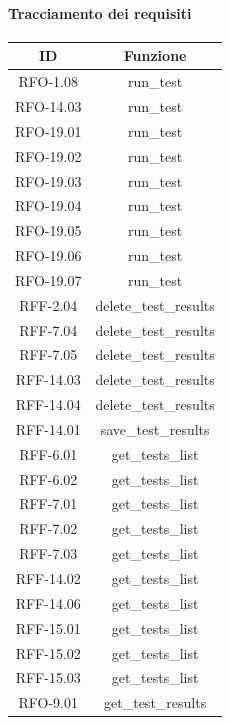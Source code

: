 \paragraph{Tracciamento dei requisiti}
\begin{tabularx}{\textwidth}{|c|c|}
    \hline
    \textbf{ID} & \textbf{Funzione} \\
    \hline
        RFO-1.08 & run\_test\\
    \hline
        RFO-14.03 & run\_test\\
    \hline
        RFO-19.01 & run\_test\\
    \hline
        RFO-19.02 & run\_test\\
    \hline
        RFO-19.03 & run\_test\\
    \hline
        RFO-19.04 & run\_test\\
    \hline
        RFO-19.05 & run\_test\\
    \hline
        RFO-19.06 & run\_test\\
    \hline
        RFO-19.07 & run\_test\\
    \hline
        RFF-2.04 & delete\_test\_results\\
    \hline
        RFF-7.04 & delete\_test\_results\\
    \hline
        RFF-7.05 & delete\_test\_results\\
    \hline
        RFF-14.03 & delete\_test\_results\\
    \hline
        RFF-14.04 & delete\_test\_results\\
    \hline
        RFF-14.01 & save\_test\_results\\
    \hline
        RFF-6.01 & get\_tests\_list\\
    \hline
        RFF-6.02 & get\_tests\_list\\
    \hline
        RFF-7.01 & get\_tests\_list\\
    \hline
        RFF-7.02 & get\_tests\_list\\
    \hline
        RFF-7.03 & get\_tests\_list\\
    \hline
        RFF-14.02 & get\_tests\_list\\
    \hline
        RFF-14.06 & get\_tests\_list\\
    \hline
        RFF-15.01 & get\_tests\_list\\
    \hline
        RFF-15.02 & get\_tests\_list\\
    \hline
        RFF-15.03 & get\_tests\_list\\
    \hline
        RFO-9.01 & get\_test\_results\\

\end{tabularx}
